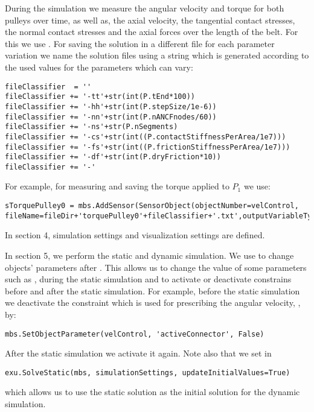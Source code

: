 \item{During the simulation we measure the angular velocity and torque for both pulleys over time, as well as, the axial velocity, the tangential contact stresses, the normal contact stresses and the axial forces over the length of the belt. For this we use . For saving the solution in a different file for each parameter variation we name the solution files using a string which is generated according to the used values for the parameters which can vary:
\pythonstyle
\begin{tcolorbox}\begin{lstlisting}
fileClassifier  = ''
fileClassifier += '-tt'+str(int(P.tEnd*100))
fileClassifier += '-hh'+str(int(P.stepSize/1e-6))
fileClassifier += '-nn'+str(int(P.nANCFnodes/60))
fileClassifier += '-ns'+str(P.nSegments)
fileClassifier += '-cs'+str(int((P.contactStiffnessPerArea/1e7)))
fileClassifier += '-fs'+str(int((P.frictionStiffnessPerArea/1e7)))
fileClassifier += '-df'+str(int(P.dryFriction*10))
fileClassifier += '-' 
\end{lstlisting}\end{tcolorbox} 
For example, for measuring and saving the torque applied to $P_1$ we use:
\pythonstyle
\begin{tcolorbox}\begin{lstlisting}
sTorquePulley0 = mbs.AddSensor(SensorObject(objectNumber=velControl, fileName=fileDir+'torquePulley0'+fileClassifier+'.txt',outputVariableType=exu.OutputVariableType.Force))
\end{lstlisting}\end{tcolorbox}
}    
\ei
\item{In section 4, simulation settings and visualization settings are defined.}
\item{In section 5, we perform the static and dynamic simulation. %
We use  to change objects' parameters after . This allows us to change the value of some parameters such as ,  during the static simulation and to activate or deactivate constrains before and after the static simulation.
For example, before the static simulation we deactivate the constraint which is used for prescribing the angular velocity, , by:
\pythonstyle
\begin{tcolorbox}\begin{lstlisting}
mbs.SetObjectParameter(velControl, 'activeConnector', False)
\end{lstlisting}\end{tcolorbox} 
After the static simulation we activate it again.
Note also that we set  in 
\pythonstyle
\begin{tcolorbox}\begin{lstlisting}
exu.SolveStatic(mbs, simulationSettings, updateInitialValues=True) 
\end{lstlisting}\end{tcolorbox}
which allows us to use the static solution as the initial solution for the dynamic simulation.}
